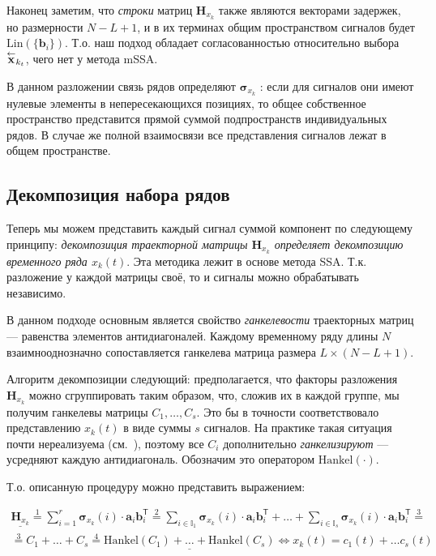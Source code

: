 	    	Наконец заметим, что \emph{строки} матриц $ \mathbf{H}_{x_k} $ также являются векторами задержек, но размерности $ N - L + 1 $, и в их терминах общим пространством сигналов будет $ \text{Lin}(\{\mathbf{b}_i\}) $. Т.о. наш подход обладает согласованностью относительно выбора $ \overset{\leftarrow}{\mathbf{x}}_{k_t} $, чего нет у метода mSSA.
	    	
	    	В данном разложении связь рядов определяют $ \boldsymbol{\sigma}_{x_k} $ : если для сигналов они имеют нулевые элементы в непересекающихся позициях, то общее собственное пространство представится прямой суммой подпространств индивидуальных рядов. В случае же полной взаимосвязи все представления сигналов лежат в общем пространстве.
	    	
	    \subsection*{Декомпозиция набора рядов}\label{sec:decomposition}
	    
	    	Теперь мы можем представить каждый сигнал суммой компонент по следующему принципу: \emph{декомпозиция траекторной матрицы $ \mathbf{H}_{x_k} $ определяет декомпозицию временного ряда $ x_k(t) $}. Эта методика лежит в основе метода SSA. Т.к. разложение у каждой матрицы своё, то и сигналы можно обрабатывать независимо.
	    	
	    	В данном подходе основным является свойство \emph{ганкелевости} траекторных матриц --- равенства элементов антидиагоналей. Каждому временному ряду длины $ N $ взаимнооднозначно сопоставляется ганкелева матрица размера $ L \times (N - L + 1) $.
	    	
	    	Алгоритм декомпозиции следующий: предполагается, что факторы разложения $ \mathbf{H}_{x_k} $ можно сгруппировать таким образом, что, сложив их в каждой группе, мы получим ганкелевы матрицы $ C_1, \ldots, C_s $. Это бы в точности соответствовало представлению $ x_k(t) $ в виде суммы $ s $ сигналов. На практике такая ситуация почти нереализуема (см.~\cite{ecfb9dc578be43ae9ee8fc88b8ff9151}), поэтому все $ C_i $ дополнительно \emph{ганкелизируют} --- усредняют каждую антидиагональ. Обозначим это оператором $ \text{Hankel}(\cdot) $. 
	    	
	    	Т.о. описанную процедуру можно представить выражением:
	    	
	    	\begin{multline}\label{eq:decomp_method_ideal}
	    		\underline{\mathbf{H}_{x_k}} \overset{1}{=} \sum\limits_{i = 1}^{r} \boldsymbol{\sigma}_{x_k}(i) \cdot \mathbf{a}_i  \mathbf{b}_i^{\mathsf{T}} \overset{2}{=} \sum\limits_{i \in \mathbb{I}_1} \boldsymbol{\sigma}_{x_k}(i) \cdot \mathbf{a}_i  \mathbf{b}_i^{\mathsf{T}} + \ldots + \sum\limits_{i \in \mathbb{I}_s} \boldsymbol{\sigma}_{x_k}(i) \cdot \mathbf{a}_i  \mathbf{b}_i^{\mathsf{T}} \overset{3}{=} \\ \overset{3}{=} C_1 + \ldots + C_s \overset{4}{=} \underline{\text{Hankel}(C_1) + \ldots + \text{Hankel}(C_s)}  \Leftrightarrow x_k(t) = c_1(t) + \ldots c_s(t)
	    	\end{multline}
	    	
